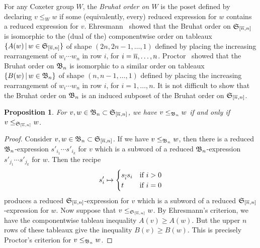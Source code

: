 \documentclass[11pt]{article}
\newtheorem{prop}[theo]{Proposition}
\theoremstyle{definition}
\numberwithin{equation}{section}
\begin{document}

For any Coxeter group $W$,
the {\em Bruhat order on $W$} is the poset
defined by declaring $v \leq_W w$ 
if
some (equivalently, every)
reduced expression for $w$ contains a reduced expression for $v$.
Ehresmann~\cite{Ehresmann}
showed that the Bruhat order on $\mathfrak{S}_{\smash{[\overline{n}, n]}}$ is isomorphic
to the (dual of the)
componentwise order on tableaux $\{ A(w) \,|\, w \in \mathfrak{S}_{\smash{[\overline{n}, n]}} \}$
of shape $(2n,2n-1,\dotsc,1)$ defined by placing the
increasing rearrangement of $w_i \cdots w_n$ in row $i$,
for $i = \overline{n}, \dotsc, n$.
Proctor~\cite[Thm.\,5BC]{ProctorBruhat} showed that the Bruhat order on $\mathfrak{B}_n$
is isomorphic to a similar order on tableaux $\{B(w) \,|\, w \in \mathfrak{B}_n \}$
of shape $(n,n-1,\dotsc,1)$ defined by placing the
increasing rearrangement of $w_i \cdots w_n$ in row $i$,
for $i = 1, \dotsc, n$.
It is not difficult to show that the Bruhat order on $\mathfrak{B}_n$ is
an induced subposet of the Bruhat order on $\mathfrak{S}_{\smash{[\overline{n}, n]}}$.
\begin{prop}\label{p:abcbruhat}
  For $v, w \in \mathfrak{B}_n \subset \mathfrak{S}_{\smash{[\overline{n}, n]}}$, we have $v \leq_{\mathfrak{B}_n} w$ if and only if
  $v \leq_{\mathfrak{S}_{\smash{[\overline{n}, n]}}} w$.
\end{prop}
\begin{proof}
  Consider $v, w \in \mathfrak{B}_n \subset \mathfrak{S}_{\smash{[\overline{n}, n]}}$.
  If we have $v \leq_{\mathfrak{B}_n} w$,
  then there is a reduced $\mathfrak{B}_n$-expression $s'_{i_1} \cdots s'_{i_k}$ for $v$
  which is a subword of a reduced $\mathfrak{B}_n$-expression $s'_{j_1} \cdots s'_{j_k}$
  for $w$.
  Then the recipe
  \begin{equation*}
    s'_i \mapsto \begin{cases}
      s_{\overline{i}} s_i &\text{if $i > 0$}\\
      t &\text{if $i = 0$}
    \end{cases}
  \end{equation*}
  produces a reduced $\mathfrak{S}_{\smash{[\overline{n}, n]}}$-expression for $v$
  which is a subword of a reduced $\mathfrak{S}_{\smash{[\overline{n}, n]}}$-expression for $w$.
  Now suppose that $v \leq_{\mathfrak{S}_{\smash{[\overline{n}, n]}}} w$.
  By Ehresmann's criterion, we have the componentwise
  tableau inequality $A(v) \geq A(w)$.
  But the upper $n$ rows of these tableaux give the inequality $B(v) \geq B(w)$.
  This is precisely Proctor's criterion for $v \leq_{\mathfrak{B}_{n}} w$.
  \end{proof}
  

\end{document}
